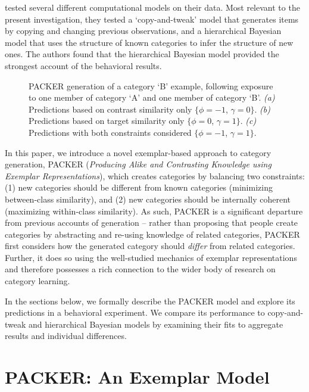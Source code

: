 \documentclass[10pt,letterpaper]{article}
\newcommand\inputpgf[2]{{
\let\pgfimageWithoutPath\pgfimage
\renewcommand{\pgfimage}[2][]{\pgfimageWithoutPath[##1]{#1/##2}}

}}
\begin{document}
\citet{jern2013probabilistic} tested several different computational models on their data. Most relevant to the present investigation, they tested a `copy-and-tweak' model that generates items by copying and changing previous observations, and a hierarchical Bayesian model that uses the structure of known categories to infer the structure of new ones. The authors found that the hierarchical Bayesian model provided the strongest account of the behavioral results.


\begin{figure*}
    \begin{center}
    \inputpgf{figs/}{example.spaces.pgf}
    \caption{PACKER generation of a category `B' example, following exposure to one member of category `A' and one member of category `B'. \textit{(a)} Predictions based on contrast similarity only $\{\phi = -1$, $\gamma = 0\}$. \textit{(b)} Predictions based on target similarity only $\{\phi = 0$, $\gamma = 1\}$.  \textit{(c)} Predictions with both constraints considered $\{\phi = -1$, $\gamma = 1\}$.  }
    \label{fig:example-prob-spaces}
    \end{center}
\end{figure*}

In this paper, we introduce a novel exemplar-based approach to category generation, PACKER (\textit{Producing Alike and Contrasting Knowledge using Exemplar Representations}), which creates  categories by balancing two constraints: (1) new categories should be different from known categories (minimizing between-class similarity), and (2) new categories should be internally coherent (maximizing within-class similarity). As such, PACKER is a significant departure from previous accounts of generation -- rather than proposing that people create categories by abstracting and re-using knowledge of related categories, PACKER first considers how the generated category should \textit{differ} from related categories. Further, it does so using the well-studied mechanics of exemplar representations and therefore possesses a rich connection to the wider body of research on category learning.

In the sections below, we formally describe the PACKER model and explore its predictions in a behavioral experiment. We compare its performance to copy-and-tweak and hierarchical Bayesian models by examining their fits to aggregate results and individual differences.

\section{PACKER: An Exemplar Model}
\end{document}
